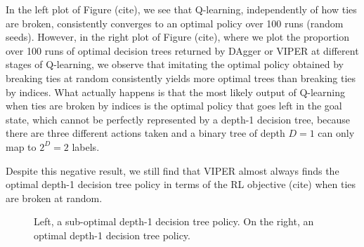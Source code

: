 In the left plot of Figure (cite), we see that Q-learning, independently of how ties are broken, consistently converges to an optimal policy over 100 runs (random seeds).
However, in the right plot of Figure (cite), where we plot the proportion over 100 runs of optimal decision trees returned by DAgger or VIPER at different stages of Q-learning, we observe that imitating the optimal policy obtained by breaking ties at random consistently yields more optimal trees than breaking ties by indices.
What actually happens is that the most likely output of Q-learning when ties are broken by indices is the optimal policy that goes left in the goal state,
which cannot be perfectly represented by a depth-1 decision tree, because there are three different actions taken and a binary tree of depth $D=1$ can only map to $2^D=2$ labels.

Despite this negative result, we still find that VIPER almost always finds the optimal depth-1 decision tree policy in terms of the RL objective (cite) when ties are broken at random.

\begin{figure}[h]
    \centering
    \caption{Left, a sub-optimal depth-1 decision tree policy. On the right, an optimal depth-1 decision tree policy.}
    \end{figure}

